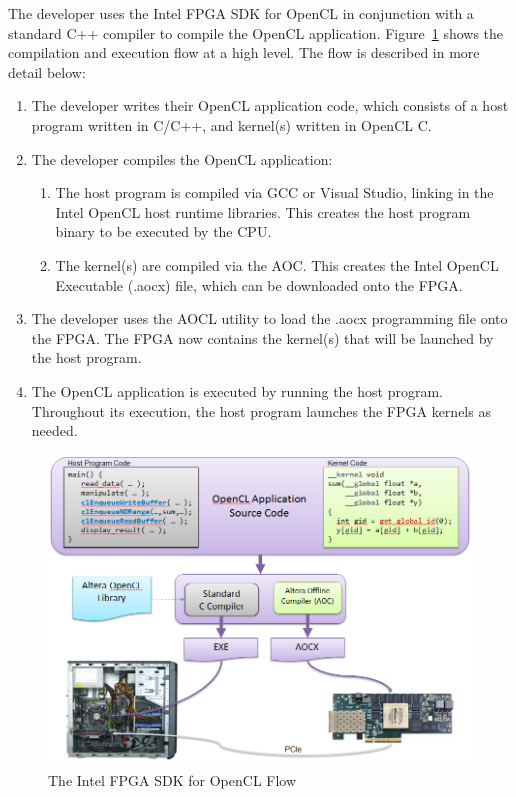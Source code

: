 \documentclass[11pt, twoside, pdftex]{article}
\begin{document}
The developer uses the Intel FPGA SDK for OpenCL in conjunction with a standard C++ compiler to compile the OpenCL application. Figure~\ref{fig:altera_sdk_flow} shows the compilation and execution flow at a high level. The flow is described in more detail below:

\begin{enumerate}
\item The developer writes their OpenCL application code, which consists of a host program written in C/C++, and kernel(s) written in OpenCL C.
\item The developer compiles the OpenCL application:
\begin{enumerate}
\item The host program is compiled via GCC or Visual Studio, linking in the Intel OpenCL host runtime libraries. This creates the host program binary to be executed by the CPU.
\item The kernel(s) are compiled via the AOC. This creates the Intel OpenCL Executable (.aocx) file, which can be downloaded onto the FPGA. %
\end{enumerate}
\item The developer uses the AOCL utility to load the .aocx programming file onto the FPGA. The FPGA now contains the kernel(s) that will be launched by the host program.
\item The OpenCL application is executed by running the host program. Throughout its execution, the host program launches the FPGA kernels as needed.  %
\end{enumerate}

\begin{figure} [H]
\begin{center}
\includegraphics[scale = 0.7]{figures/flow.png}
\end{center}
\caption{The Intel FPGA SDK for OpenCL Flow}
\label{fig:altera_sdk_flow}
\end{figure}
\end{document}
